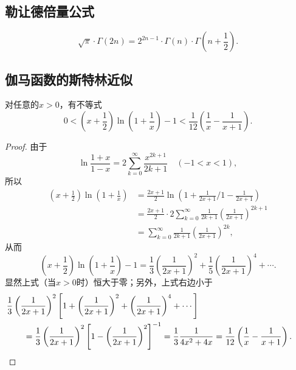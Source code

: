 \subsection{勒让德倍量公式}
\begin{theorem}[勒让德倍量公式]
\begin{equation}\label{equation:定积分.勒让德倍量公式}
\sqrt{\pi} \cdot \Gamma(2n)
= 2^{2n-1} \cdot \Gamma(n) \cdot \Gamma\left(n+\frac{1}{2}\right).
\end{equation}
\end{theorem}

\subsection{伽马函数的斯特林近似}
\begin{lemma}\label{theorem:定积分.伽马函数的斯特灵近似.引理1}
对任意的\(x>0\)，有不等式\begin{equation}\label{equation:定积分.伽马函数的斯特灵近似.引理1}
0 < \left(x+\frac{1}{2}\right) \ln(1+\frac{1}{x}) - 1 < \frac{1}{12}\left(\frac{1}{x}-\frac{1}{x+1}\right).
\end{equation}
\begin{proof}
由于\[
\ln\frac{1+x}{1-x}
= 2 \sum\limits_{k=0}^{\infty} \frac{x^{2k+1}}{2k+1}
\quad(-1<x<1),
\]所以\begin{align*}
\left(x+\frac{1}{2}\right) \ln(1+\frac{1}{x})
&= \frac{2x+1}{2} \ln({1+\frac{1}{2x+1}}\Bigg/{1-\frac{1}{2x+1}}) \\
&= \frac{2x+1}{2} \cdot
2 \sum\limits_{k=0}^{\infty} \frac{1}{2k+1} \left(\frac{1}{2x+1}\right)^{2k+1} \\
&= \sum\limits_{k=0}^{\infty} \frac{1}{2k+1} \left(\frac{1}{2x+1}\right)^{2k},
\end{align*}从而\[
\left(x+\frac{1}{2}\right) \ln(1+\frac{1}{x}) - 1
= \frac{1}{3} \left(\frac{1}{2x+1}\right)^2
+ \frac{1}{5} \left(\frac{1}{2x+1}\right)^4
+ \dotsb.
\]显然上式（当\(x>0\)时）恒大于零；另外，上式右边小于\begin{align*}
&\hspace{-20pt}
\frac{1}{3} \left(\frac{1}{2x+1}\right)^2 \left[
1 + \left(\frac{1}{2x+1}\right)^2 + \left(\frac{1}{2x+1}\right)^4 + \dotsb
\right] \\
&= \frac{1}{3} \left(\frac{1}{2x+1}\right)^2 \left[
1 - \left(\frac{1}{2x+1}\right)^2
\right]^{-1}
= \frac{1}{3} \frac{1}{4x^2 + 4x}
= \frac{1}{12} \left(\frac{1}{x} - \frac{1}{x+1}\right).
\qedhere
\end{align*}
\end{proof}
\end{lemma}

